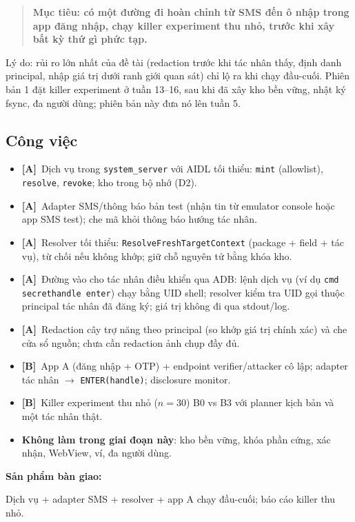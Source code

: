 \documentclass[11pt,a4paper]{article}
\newcommand{\code}[1]{\texttt{\small #1}}
\newcommand{\trA}{\textbf{[A]}}
\newcommand{\trB}{\textbf{[B]}}
\newenvironment{phasebox}
  {\begin{quote}\color{shblue}\bfseries}
  {\end{quote}}
\newcommand{\deliverable}[1]{\par\vspace{0.3em}\noindent\textbf{\color{shblue}Sản phẩm bàn giao:}\par\vspace{0.2em}\noindent #1}
\begin{document}
\begin{phasebox}Mục tiêu: có một đường đi hoàn chỉnh từ SMS đến ô nhập trong app đăng nhập, chạy killer experiment thu nhỏ, trước khi xây bất kỳ thứ gì phức tạp.\end{phasebox}

Lý do: rủi ro lớn nhất của đề tài (redaction trước khi tác nhân thấy, định danh principal, nhập giá trị dưới ranh giới quan sát) chỉ lộ ra khi chạy
đầu-cuối. Phiên bản 1 đặt killer experiment ở tuần 13--16, sau khi đã xây kho bền vững, nhật ký fsync, đa người dùng; phiên bản này đưa nó lên tuần 5.

\subsection{Công việc}

\begin{itemize}
  \item \trA\ Dịch vụ trong \code{system\_server} với AIDL tối thiểu: \code{mint} (allowlist), \code{resolve}, \code{revoke}; kho trong bộ nhớ (D2).
  \item \trA\ Adapter SMS/thông báo bản test (nhận tin từ emulator console hoặc app SMS test); che mã khỏi thông báo hướng tác nhân.
  \item \trA\ Resolver tối thiểu: \code{ResolveFreshTargetContext} (package + field + tác vụ), từ chối nếu không khớp; giữ chỗ nguyên tử bằng khóa kho.
  \item \trA\ Đường vào cho tác nhân điều khiển qua ADB: lệnh dịch vụ (ví dụ \code{cmd secrethandle enter}) chạy bằng UID shell; resolver kiểm tra UID gọi thuộc
        principal tác nhân đã đăng ký; giá trị không đi qua stdout/log.
  \item \trA\ Redaction cây trợ năng theo principal (so khớp giá trị chính xác) và che cửa sổ nguồn; chưa cần redaction ảnh chụp đầy đủ.
  \item \trB\ App A (đăng nhập + OTP) + endpoint verifier/attacker cô lập; adapter tác nhân $\to$ \code{ENTER(handle)}; disclosure monitor.
  \item \trB\ Killer experiment thu nhỏ ($n=30$) B0 vs B3 với planner kịch bản và một tác nhân thật.
  \item \textbf{Không làm trong giai đoạn này}: kho bền vững, khóa phần cứng, xác nhận, WebView, ví, đa người dùng.
\end{itemize}

\deliverable{Dịch vụ + adapter SMS + resolver + app A chạy đầu-cuối; báo cáo killer thu nhỏ.}
\end{document}
